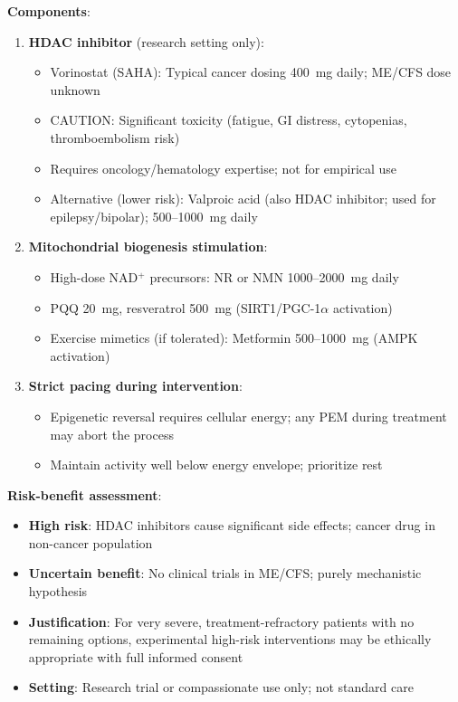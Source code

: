 \textbf{Components}:
\begin{enumerate}
    \item \textbf{HDAC inhibitor} (research setting only):
    \begin{itemize}
        \item Vorinostat (SAHA): Typical cancer dosing 400~mg daily; ME/CFS dose unknown
        \item CAUTION: Significant toxicity (fatigue, GI distress, cytopenias, thromboembolism risk)
        \item Requires oncology/hematology expertise; not for empirical use
        \item Alternative (lower risk): Valproic acid (also HDAC inhibitor; used for epilepsy/bipolar); 500--1000~mg daily
    \end{itemize}

    \item \textbf{Mitochondrial biogenesis stimulation}:
    \begin{itemize}
        \item High-dose NAD$^+$ precursors: NR or NMN 1000--2000~mg daily
        \item PQQ 20~mg, resveratrol 500~mg (SIRT1/PGC-1$\alpha$ activation)
        \item Exercise mimetics (if tolerated): Metformin 500--1000~mg (AMPK activation)
    \end{itemize}

    \item \textbf{Strict pacing during intervention}:
    \begin{itemize}
        \item Epigenetic reversal requires cellular energy; any PEM during treatment may abort the process
        \item Maintain activity well below energy envelope; prioritize rest
    \end{itemize}
\end{enumerate}

\textbf{Risk-benefit assessment}:
\begin{itemize}
    \item \textbf{High risk}: HDAC inhibitors cause significant side effects; cancer drug in non-cancer population
    \item \textbf{Uncertain benefit}: No clinical trials in ME/CFS; purely mechanistic hypothesis
    \item \textbf{Justification}: For very severe, treatment-refractory patients with no remaining options, experimental high-risk interventions may be ethically appropriate with full informed consent
    \item \textbf{Setting}: Research trial or compassionate use only; not standard care
\end{itemize}

